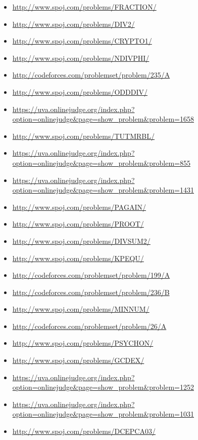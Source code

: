 \begin{itemize}
\item \url{http://www.spoj.com/problems/FRACTION/}
\item \url{http://www.spoj.com/problems/DIV2/}
\item \url{http://www.spoj.com/problems/CRYPTO1/}
\item \url{http://www.spoj.com/problems/NDIVPHI/}
\item \url{http://codeforces.com/problemset/problem/235/A}
\item \url{http://www.spoj.com/problems/ODDDIV/}
\item \url{https://uva.onlinejudge.org/index.php?option=onlinejudge&page=show_problem&problem=1658}
\item \url{http://www.spoj.com/problems/TUTMRBL/}
\item \url{https://uva.onlinejudge.org/index.php?option=onlinejudge&page=show_problem&problem=855}
\item \url{https://uva.onlinejudge.org/index.php?option=onlinejudge&page=show_problem&problem=1431}
\item \url{http://www.spoj.com/problems/PAGAIN/}
\item \url{http://www.spoj.com/problems/PROOT/}
\item \url{http://www.spoj.com/problems/DIVSUM2/}
\item \url{http://www.spoj.com/problems/KPEQU/}
\item \url{http://codeforces.com/problemset/problem/199/A}
\item \url{http://codeforces.com/problemset/problem/236/B}
\item \url{http://www.spoj.com/problems/MINNUM/}
\item \url{http://codeforces.com/problemset/problem/26/A}
\item \url{http://www.spoj.com/problems/PSYCHON/}
\item \url{http://www.spoj.com/problems/GCDEX/}
\item \url{https://uva.onlinejudge.org/index.php?option=onlinejudge&page=show_problem&problem=1252}
\item \url{https://uva.onlinejudge.org/index.php?option=onlinejudge&page=show_problem&problem=1031}
\item \url{http://www.spoj.com/problems/DCEPCA03/}
\end{itemize}


